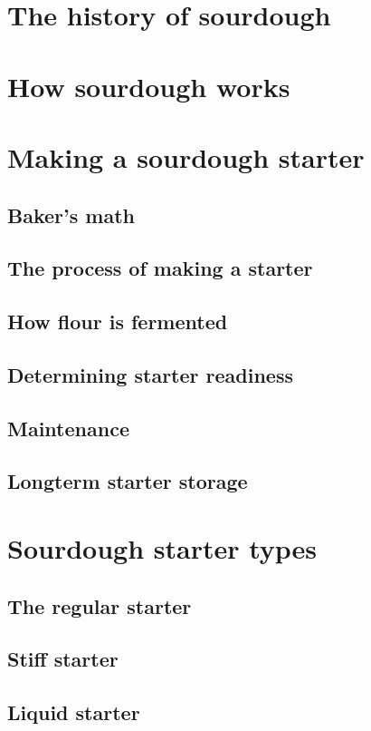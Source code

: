 \documentclass[a4paper, 12pt]{book}
\begin{document}
\mainmatter

\chapter{The history of sourdough}


\chapter{How sourdough works}


\chapter{Making a sourdough starter}
\section{Baker's math}
\section{The process of making a starter}
\section{How flour is fermented}
\section{Determining starter readiness}
\section{Maintenance}
\section{Longterm starter storage}

\chapter{Sourdough starter types}
\section{The regular starter}
\section{Stiff starter}
\section{Liquid starter}
\end{document}
